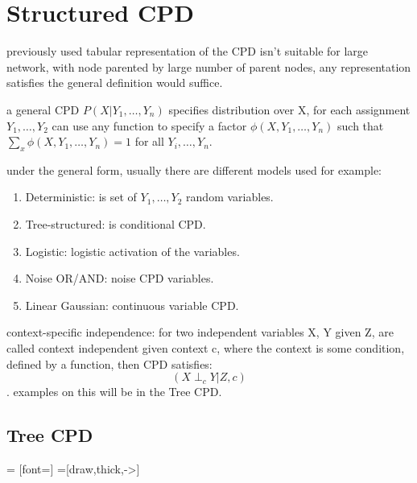 \documentclass[4apaper,12pt]{book}
\begin{document}
  \section{Structured CPD}
  \begin{description}
  \item previously used tabular representation of the CPD isn't suitable for large network, with node parented by large number of parent nodes, any representation satisfies the general definition would suffice.
  \item a general CPD $P(X|Y_1,\dots,Y_n)$ specifies distribution over X, for each assignment $Y_1,\dots,Y_2$ can use any function to specify a factor $\phi(X,Y_1,\dots,Y_n)$ such that $\sum_x\phi(X,Y_1,\dots,Y_n)=1$ for all $Y_i,\dots,Y_n$.
  \item under the general form, usually there are different models used for example:\begin{enumerate}
  \item Deterministic: is set of $Y_1,\dots,Y_2$  random variables.
  \item Tree-structured: is conditional CPD.
  \item Logistic: logistic activation of the variables.
  \item Noise OR/AND: noise CPD variables.
  \item Linear Gaussian: continuous variable CPD.

  \end{enumerate}
  \item context-specific independence: for two independent variables X, Y given Z, are called context independent given context c, where the context is some condition, defined by a function, then CPD satisfies: $$ (X\perp_c Y | Z,c) $$. examples on this will be in the Tree CPD.

    \subsection{Tree CPD}
    \begin{description}
       = [font=\scriptsize]
       =[draw,thick,->]
    \item  {}
\end{description}
\end{description}
\end{document}
